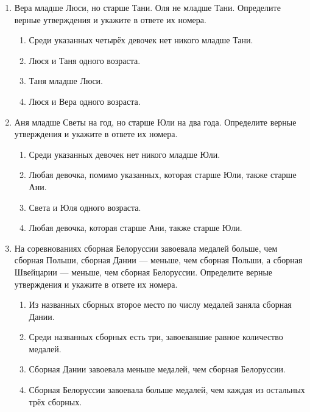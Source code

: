 \documentclass[a4paper,12pt]{article}
\newcommand{\taskspace}{\par\vspace{0.42cm}}
\begin{document}
\begin{enumerate}[resume]
\taskspace

\item Вера младше Люси, но старше Тани. Оля не младше Тани. Определите верные утверждения и укажите в ответе их номера.
\begin{enumerate}[label=\arabic*),leftmargin=8mm,itemsep=0.25em,topsep=0.35em]
\item Среди указанных четырёх девочек нет никого младше Тани.
\item Люся и Таня одного возраста.
\item Таня младше Люси.
\item Люся и Вера одного возраста.
\end{enumerate}

\taskspace

\item Аня младше Светы на год, но старше Юли на два года. Определите верные утверждения и укажите в ответе их номера.
\begin{enumerate}[label=\arabic*),leftmargin=8mm,itemsep=0.25em,topsep=0.35em]
\item Среди указанных девочек нет никого младше Юли.
\item Любая девочка, помимо указанных, которая старше Юли, также старше Ани.
\item Света и Юля одного возраста.
\item Любая девочка, которая старше Ани, также старше Юли.
\end{enumerate}

\taskspace

\item На соревнованиях сборная Белоруссии завоевала медалей больше, чем сборная Польши, сборная Дании --- меньше, чем сборная Польши, а сборная Швейцарии --- меньше, чем сборная Белоруссии. Определите верные утверждения и укажите в ответе их номера.
\begin{enumerate}[label=\arabic*),leftmargin=8mm,itemsep=0.25em,topsep=0.35em]
\item Из названных сборных второе место по числу медалей заняла сборная Дании.
\item Среди названных сборных есть три, завоевавшие равное количество медалей.
\item Сборная Дании завоевала меньше медалей, чем сборная Белоруссии.
\item Сборная Белоруссии завоевала больше медалей, чем каждая из остальных трёх сборных.
\end{enumerate}


\end{enumerate}
\end{document}

